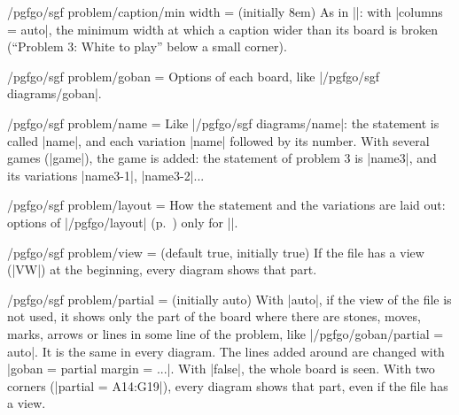 \begin{key}{/pgfgo/sgf problem/caption/min width =  (initially 8em)}
	As in |\sgfdiagrams|: with |columns = auto|, the minimum width at which a caption wider than its board is broken (``Problem 3: White to play'' below a small corner).
\end{key}

\begin{key}{/pgfgo/sgf problem/goban = }
	Options of each board, like |/pgfgo/sgf diagrams/goban|.
\end{key}

\begin{key}{/pgfgo/sgf problem/name = }
	Like |/pgfgo/sgf diagrams/name|: the statement is called |name|, and each variation |name| followed by its number. With several games (|game|), the game is added: the statement of problem 3 is |name3|, and its variations |name3-1|, |name3-2|...
\end{key}

\begin{key}{/pgfgo/sgf problem/layout = }
	How the statement and the variations are laid out: options of |/pgfgo/layout| (p.~\pageref{subsec:disposicion}) only for |\sgfproblem|.
\end{key}

\begin{key}{/pgfgo/sgf problem/view =  (default true, initially true)}
	If the file has a view (|VW|) at the beginning, every diagram shows that part.
\end{key}

\begin{key}{/pgfgo/sgf problem/partial =  (initially auto)}
	With |auto|, if the view of the file is not used, it shows only the part of the board where there are stones, moves, marks, arrows or lines in some line of the problem, like |/pgfgo/goban/partial = auto|. It is the same in every diagram. The lines added around are changed with |goban = {partial margin = ...}|. With |false|, the whole board is seen. With two corners (|partial = A14:G19|), every diagram shows that part, even if the file has a view.

	\begin{codeexample}
	\end{codeexample}

\end{key}

